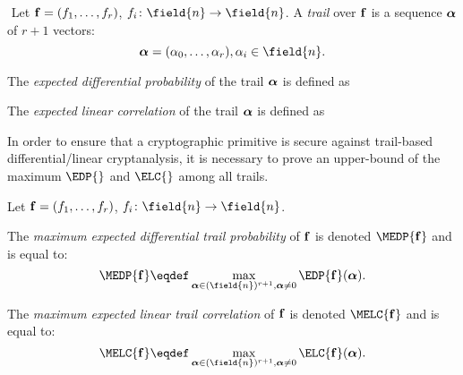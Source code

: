 \begin{definition}
$ $\newline
Let $\mathbf{f} = (f_1,\ldots,f_r)$, $f_i\colon \field{n} \to \field{n}$.
A \emph{trail} over $\mathbf{f}$ is a sequence $\boldsymbol{\alpha}$ of $r+1$ vectors:
$$
\valpha = (\alpha_0, \ldots, \alpha_r), \alpha_i \in \field{n}.
$$

The \emph{expected differential probability} of the trail $\boldsymbol{\alpha}$ is defined as 

The \emph{expected linear correlation} of the trail $\boldsymbol{\alpha}$ is defined as 
\end{definition}


In order to ensure that a cryptographic primitive is secure against trail-based differential/linear cryptanalysis, it is necessary to prove an upper-bound of the maximum $\EDP{}$ and $\ELC{}$ among all trails.

\begin{definition}
Let $\mathbf{f} = (f_1,\ldots,f_r)$, $f_i\colon \field{n} \to \field{n}$. 

The \emph{maximum expected differential trail probability} of $\mathbf{f}$ is denoted $\MEDP{\vf}$ and is equal to:
$$
\MEDP{\vf} \eqdef \max_{\valpha \in (\field{n})^{r+1}, \valpha \ne 0} \EDP{\vf}(\valpha).
$$

The \emph{maximum expected linear trail correlation} of $\mathbf{f}$ is denoted $\MELC{\vf}$ and is equal to:
$$
\MELC{\vf} \eqdef \max_{\valpha \in (\field{n})^{r+1}, \valpha \ne 0} \ELC{\vf}(\valpha).
$$
\end{definition}



